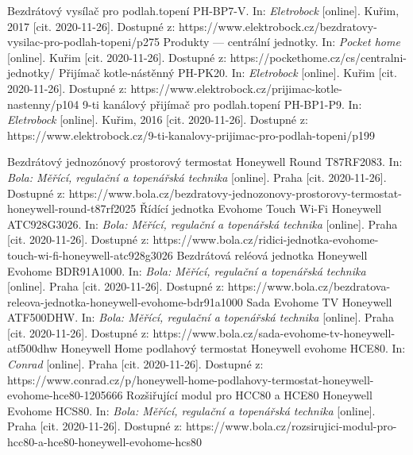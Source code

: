 \begin{thebibliography}{3}
Bezdrátový vysílač pro podlah.topení PH-BP7-V. In: \textit{Eletrobock} [online]. Kuřim, 2017 [cit. 2020-11-26]. Dostupné z: https://www.elektrobock.cz/bezdratovy-vysilac-pro-podlah-topeni/p275
Produkty --- centrální jednotky. In: \textit{Pocket home} [online]. Kuřim [cit. 2020-11-26]. Dostupné z: https://pockethome.cz/cs/centralni-jednotky/
Přijímač kotle-nástěnný PH-PK20. In: \textit{Eletrobock} [online]. Kuřim [cit. 2020-11-26]. Dostupné z: https://www.elektrobock.cz/prijimac-kotle-nastenny/p104
9-ti kanálový přijímač pro podlah.topení PH-BP1-P9. In: \textit{Eletrobock} [online]. Kuřim, 2016 [cit. 2020-11-26]. Dostupné z: https://www.elektrobock.cz/9-ti-kanalovy-prijimac-pro-podlah-topeni/p199

Bezdrátový jednozónový prostorový termostat Honeywell Round T87RF2083. In: \textit{Bola: Měřící, regulační a topenářská technika} [online]. Praha [cit. 2020-11-26]. Dostupné z: https://www.bola.cz/bezdratovy-jednozonovy-prostorovy-termostat-honeywell-round-t87rf2025
Řídící jednotka Evohome Touch Wi-Fi Honeywell ATC928G3026. In: \textit{Bola: Měřící, regulační a topenářská technika} [online]. Praha [cit. 2020-11-26]. Dostupné z: https://www.bola.cz/ridici-jednotka-evohome-touch-wi-fi-honeywell-atc928g3026
Bezdrátová reléová jednotka Honeywell Evohome BDR91A1000. In: \textit{Bola: Měřící, regulační a topenářská technika} [online]. Praha [cit. 2020-11-26]. Dostupné z: https://www.bola.cz/bezdratova-releova-jednotka-honeywell-evohome-bdr91a1000
Sada Evohome TV Honeywell ATF500DHW. In: \textit{Bola: Měřící, regulační a topenářská technika} [online]. Praha [cit. 2020-11-26]. Dostupné z: https://www.bola.cz/sada-evohome-tv-honeywell-atf500dhw
Honeywell Home podlahový termostat Honeywell evohome HCE80. In: \textit{Conrad} [online]. Praha [cit. 2020-11-26]. Dostupné z: https://www.conrad.cz/p/honeywell-home-podlahovy-termostat-honeywell-evohome-hce80-1205666
Rozšiřující modul pro HCC80 a HCE80 Honeywell Evohome HCS80. In: \textit{Bola: Měřící, regulační a topenářská technika} [online]. Praha [cit. 2020-11-26]. Dostupné z: https://www.bola.cz/rozsirujici-modul-pro-hcc80-a-hce80-honeywell-evohome-hcs80


\end{thebibliography}

